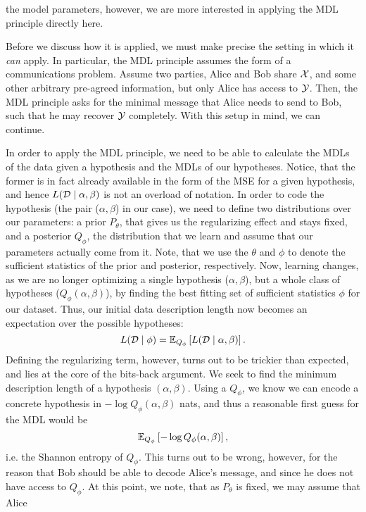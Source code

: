 the model parameters, however, we are more interested in applying the MDL
principle directly here.
\par
Before we discuss how it is applied, we must make precise the setting in which
it \textit{can} apply. In particular, the MDL principle assumes the form of a
communications problem. Assume two parties, Alice and Bob share $\X$, and some
other arbitrary pre-agreed information, but only Alice has access to $\Y$. Then,
the MDL principle asks for the minimal message that Alice needs to send to Bob,
such that he may recover $\Y$ completely. With this setup in mind, we can continue.
\par
In order to apply the MDL principle, we need to be able to calculate the
MDLs of the data given a hypothesis and the MDLs of our hypotheses.
Notice, that the former is in fact already available
in the form of the MSE for a given hypothesis, and hence $L(\Data \mid \alpha,
\beta)$ is not an overload of notation. In order to code the hypothesis
(the pair ($\alpha, \beta$) in our
case), we need to define two distributions over our parameters: a prior $P_\theta$, that
gives us the regularizing effect and stays fixed, and a posterior $Q_\phi$, the
distribution that we learn and assume that our parameters actually come
from it. Note, that we use the $\theta$ and $\phi$ to denote the sufficient
statistics of the prior and posterior, respectively. Now, learning changes, as
we are no longer optimizing a single hypothesis ($\alpha, \beta$), but a whole
class of hypotheses ($Q_\phi(\alpha, \beta)$), by finding the best fitting set
of sufficient statistics $\phi$ for our dataset. Thus, our initial data
description length now becomes an expectation over the possible hypotheses:
\[
  L(\Data \mid \phi) = \Exp{L(\Data \mid \alpha, \beta)}{Q_\phi}.
\]
Defining the regularizing term, however, turns out to be trickier than expected,
and lies at the core of the bits-back argument. We seek to find the minimum
description length of a hypothesis $(\alpha, \beta)$. Using a $Q_\phi$, we know
we can encode a concrete hypothesis in $-\log Q_\phi (\alpha, \beta)$ nats, and thus a
reasonable first guess for the MDL would be
\begin{equation}
\label{eq:hypothesis_entropy}
  \Exp{-\log Q_\phi(\alpha, \beta)}{Q_\phi},
\end{equation}
i.e. the Shannon entropy of $Q_\phi$.
This turns out to be wrong, however, for the reason that Bob should be able to
decode Alice's message, and since he does not have access to $Q_\phi$. 
At this point, we note, that as $P_\theta$ is fixed, we may assume that Alice
